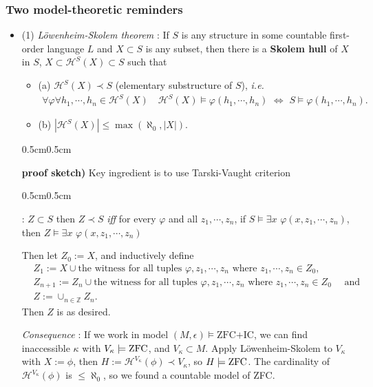 \documentclass[12pt,a4paper]{article}
\newenvironment{subproof}
{\begin{changemargin}{0.5cm}{0.5cm} 
	}%
	{\end{changemargin}
}
\renewenvironment{i}
{\begin{itemize} 
	}%
	{\end{itemize}
}
\begin{document}
\subsubsection*{Two model-theoretic reminders}
\begin{i}
\item[(1)] \emph{L\"owenheim-Skolem theorem} : If $S$ is any structure in some countable first-order language $L$ and $X\subset S$ is any subset, then there is a \textbf{Skolem hull} of $X$ in $S$, $X\subset \mathcal{H}^S(X) \subset S$ such that
\begin{i}
\item[(a)] $\mathcal{H}^S(X) \prec S$ (elementary substructure of $S$), \textit{i.e.} 
\begin{align*}
\forall \varphi \forall h_1,\cdots,h_n \in \mathcal{H}^S(X)\quad \mathcal{H}^S(X) \models \varphi(h_1, \cdots, h_n) \,\, \Leftrightarrow \,\, S\models \varphi(h_1, \cdots, h_n).
\end{align*}
\item[(b)] $|\mathcal{H}^S(X)| \leq \max (\aleph_0, |X|)$.
\end{i}
\begin{subproof}
\textbf{proof sketch)} Key ingredient is to use Tarski-Vaught criterion
\begin{subproof}
: $Z\subset S$ then $Z\prec S$ \emph{iff} for every $\varphi$ and all $z_1, \cdots, z_n$, if $S\models \exists x\,\, \varphi(x, z_1, \cdots,z_n)$, then $Z\models \exists x\,\, \varphi(x, z_1, \cdots, z_n)$
\end{subproof}

Then let $Z_0 := X$, and inductively define
\begin{align*}
&Z_1 := X\cup\text{the witness for all tuples }\varphi, z_1, \cdots, z_n\text{ where }z_1, \cdots, z_n \in Z_0,\\
&Z_{n+1} :=Z_n \cup\text{the witness for all tuples }\varphi, z_1, \cdots, z_n\text{ where }z_1, \cdots, z_n \in Z_0 \quad \text{ and}\\
&Z := \cup_{n\in \mathbb{Z}}Z_n.
\end{align*}
Then $Z$ is as desired.
\end{subproof}
\emph{Consequence} : If we work in model $(M, \epsilon) \models \text{ZFC+IC}$, we can find inaccessible $\kappa$ with $V_{\kappa} \models \text{ZFC}$, and $V_{\kappa} \subset M$. Apply L\"owenheim-Skolem to $V_{\kappa}$ with $X:= \phi$, then $H:= \mathcal{H}^{V_{\kappa}} (\phi) \prec V_{\kappa}$, so $H\models \text{ZFC}$. The cardinality of $\mathcal{H}^{V_{\kappa}} (\phi)$ is $\leq \aleph_0$, so we found a countable model of ZFC.


\end{i}
\end{document}
